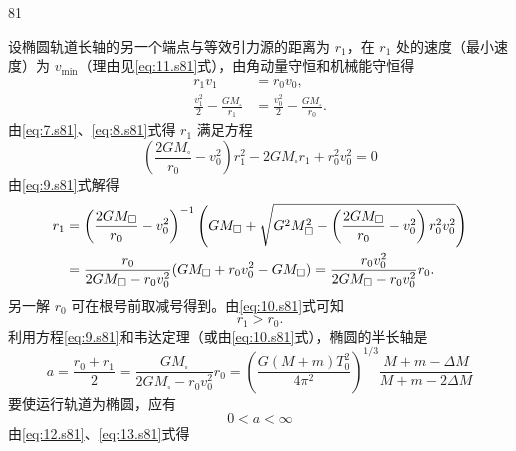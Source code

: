 \begin{solution}{81}
\begin{subsolution}
\begin{subsubsolution}
            设椭圆轨道长轴的另一个端点与等效引力源的距离为 $r_{1}$，在 $r_{1}$ 处的速度（最小速度）为 $v_{\min}$（理由见\eqref{eq:11.s81}式），由角动量守恒和机械能守恒得
            \begin{align}
                r_{1} v_{1} &= r_{0} v_{0}, \label{eq:7.s81}\\
                \frac{v_{1}^{2}}{2} - \frac{G M_{\square}}{r_{1}} &= \frac{v_{0}^{2}}{2} - \frac{G M_{\square}}{r_{0}}. \label{eq:8.s81}
            \end{align}
            由\eqref{eq:7.s81}、\eqref{eq:8.s81}式得 $r_{1}$ 满足方程
            \begin{equation}
                \left(\frac{2 G M_{\square}}{r_{0}} - v_{0}^{2}\right) r_{1}^{2} - 2 G M_{\square} r_{1} + r_{0}^{2} v_{0}^{2} = 0
                \label{eq:9.s81}
            \end{equation}
            由\eqref{eq:9.s81}式解得
            \begin{align}
                r_{1} &= \left(\frac{2 G M_{\square}}{r_{0}} - v_{0}^{2}\right)^{-1} \left( G M_{\square} + \sqrt{ G^{2} M_{\square}^{2} - \left(\frac{2 G M_{\square}}{r_{0}} - v_{0}^{2}\right) r_{0}^{2} v_{0}^{2} } \right) \notag\\
                &= \frac{r_{0}}{2 G M_{\square} - r_{0} v_{0}^{2}} ( G M_{\square} + r_{0} v_{0}^{2} - G M_{\square} ) = \frac{r_{0} v_{0}^{2}}{2 G M_{\square} - r_{0} v_{0}^{2}} r_{0}.
                \label{eq:10.s81}
            \end{align}
            另一解 $r_{0}$ 可在根号前取减号得到。由\eqref{eq:10.s81}式可知
            \begin{equation}
                r_{1} > r_{0}.
                \label{eq:11.s81}
            \end{equation}
            利用方程\eqref{eq:9.s81}和韦达定理（或由\eqref{eq:10.s81}式），椭圆的半长轴是
            \begin{equation}
                a = \frac{r_{0} + r_{1}}{2} = \frac{G M_{\square}}{2 G M_{\square} - r_{0} v_{0}^{2}} r_{0} = \left(\frac{G (M+m) T_{0}^{2}}{4\pi^{2}}\right)^{1/3} \frac{M+m-\Delta M}{M+m-2\Delta M}
                \label{eq:12.s81}
            \end{equation}
            要使运行轨道为椭圆，应有
            \begin{equation}
                0 < a < \infty
                \label{eq:13.s81}
            \end{equation}
            由\eqref{eq:12.s81}、\eqref{eq:13.s81}式得
            \begin{equation}

\end{equation}
\end{subsubsolution}
\end{subsolution}
\end{solution}
